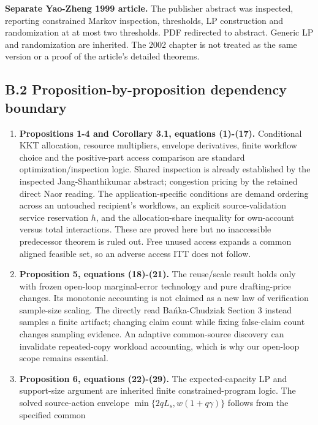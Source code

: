 \documentclass[
  11pt,
  a4paper,
]{article}
\begin{document}
\textbf{Separate Yao-Zheng 1999 article.} The publisher abstract was
inspected, reporting constrained Markov inspection, thresholds, LP
construction and randomization at at most two thresholds. PDF redirected
to abstract. Generic LP and randomization are inherited. The 2002
chapter is not treated as the same version or a proof of the article's
detailed theorems.

\hypertarget{b.2-proposition-by-proposition-dependency-boundary}{%
\subsection{B.2 Proposition-by-proposition dependency
boundary}\label{b.2-proposition-by-proposition-dependency-boundary}}

\begin{enumerate}
\def\labelenumi{\arabic{enumi}.}
\item
  \textbf{Propositions 1-4 and Corollary 3.1, equations (1)-(17).}
  Conditional KKT allocation, resource multipliers, envelope
  derivatives, finite workflow choice and the positive-part access
  comparison are standard optimization/inspection logic. Shared
  inspection is already established by the inspected Jang-Shanthikumar
  abstract; congestion pricing by the retained direct Naor reading. The
  application-specific conditions are demand ordering across an
  untouched recipient's workflows, an explicit source-validation service
  reservation \(h\), and the allocation-share inequality for own-account
  versus total interactions. These are proved here but no inaccessible
  predecessor theorem is ruled out. Free unused access expands a common
  aligned feasible set, so an adverse access ITT does not follow.
\item
  \textbf{Proposition 5, equations (18)-(21).} The reuse/scale result
  holds only with frozen open-loop marginal-error technology and pure
  drafting-price changes. Its monotonic accounting is not claimed as a
  new law of verification sample-size scaling. The directly read
  Bańka-Chudziak Section 3 instead samples a finite artifact; changing
  claim count while fixing false-claim count changes sampling evidence.
  An adaptive common-source discovery can invalidate repeated-copy
  workload accounting, which is why our open-loop scope remains
  essential.
\item
  \textbf{Proposition 6, equations (22)-(29).} The expected-capacity LP
  and support-size argument are inherited finite constrained-program
  logic. The solved source-action envelope
  \(\min\{2qL_s,w(1+q\gamma)\}\) follows from the specified common

\end{enumerate}
\end{document}
